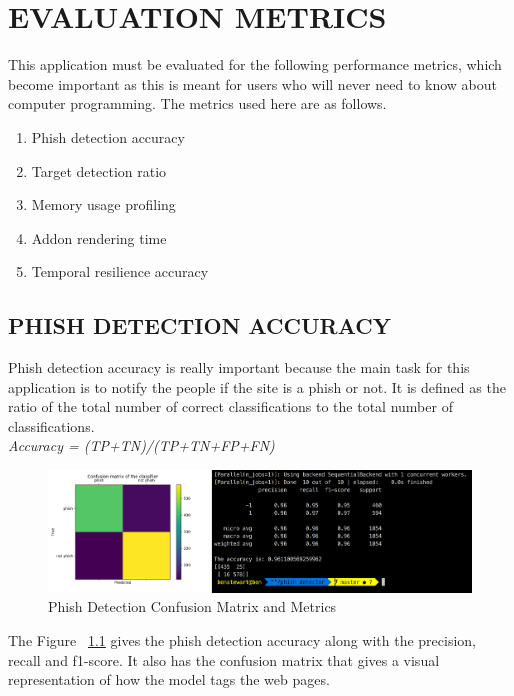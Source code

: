 
\chapter{EVALUATION METRICS} %
This application must be evaluated  for the following performance metrics, which become important as this is meant for users who will never need to know about computer programming. The metrics used here are as follows.

\begin{enumerate}
    \item Phish detection accuracy
    \item Target detection ratio
    \item Memory usage profiling
    \item Addon rendering time
    \item Temporal resilience accuracy
\end{enumerate}

\section{PHISH DETECTION ACCURACY}
Phish detection accuracy is really important because the main task for this application is to notify the people if the site is a phish or not. It is defined as the ratio of the total number of correct classifications to the total number of classifications.\\
\null\quad\textit{Accuracy = (TP+TN)/(TP+TN+FP+FN)}\\

\begin{figure}[htp]
\centering
\includegraphics[scale=0.2]{Figures/image1.png}
\caption{Phish Detection Confusion Matrix and Metrics}
\label{fig:pdcmm}
\end{figure}

The Figure ~\ref{fig:pdcmm} gives the phish detection accuracy along with the precision, recall and f1-score. It also has the confusion matrix that gives a visual representation of how the model tags the web pages.


